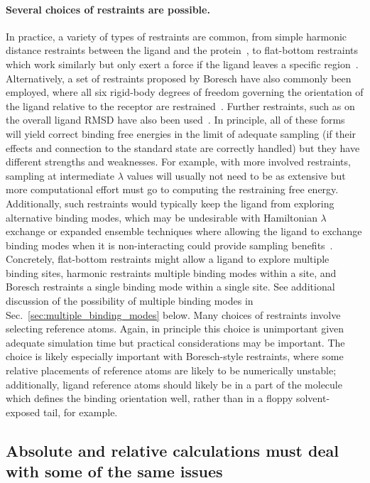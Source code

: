 \documentclass[9pt,bestpractices]{livecoms}
\begin{document}
\paragraph{Several choices of restraints are possible.}
In practice, a variety of types of restraints are common, from simple harmonic distance restraints between the ligand and the protein~\cite{mobley2006use}, to flat-bottom restraints which work similarly but only exert a force if the ligand leaves a specific region~\cite{chen2007can}.
%
Alternatively, a set of restraints proposed by Boresch have also commonly been employed, where all six rigid-body degrees of freedom governing the orientation of the ligand relative to the receptor are restrained~\cite{boresch2003absolutea, leitgeb2005alchemicala}.
Further restraints, such as on the overall ligand RMSD have also been used~\cite{woo2005calculationa}.
%
In principle, all of these forms will yield correct binding free energies in the limit of adequate sampling (if their effects and connection to the standard state are correctly handled) but they have different strengths and weaknesses.
For example, with more involved restraints, sampling at intermediate $\lambda$ values will usually not need to be as extensive but more computational effort must go to computing the restraining free energy.
Additionally, such restraints would typically keep the ligand from exploring alternative binding modes, which may be undesirable with Hamiltonian $\lambda$ exchange or expanded ensemble techniques where allowing the ligand to exchange binding modes when it is non-interacting could provide sampling benefits~\cite{wang2013identifying}.
Concretely, flat-bottom restraints might allow a ligand to explore multiple binding sites, harmonic restraints multiple binding modes within a site, and Boresch restraints a single binding mode within a single site.
See additional discussion of the possibility of multiple binding modes in Sec.~\ref{sec:multiple_binding_modes} below.
%
Many choices of restraints involve selecting reference atoms.
Again, in principle this choice is unimportant given adequate simulation time but practical considerations may be important.
The choice is likely especially important with Boresch-style restraints, where some relative placements of reference atoms are likely to be numerically unstable; additionally, ligand reference atoms should likely be in a part of the molecule which defines the binding orientation well, rather than in a floppy solvent-exposed tail, for example.

\subsection{Absolute and relative calculations must deal with some of the same issues}
\end{document}

